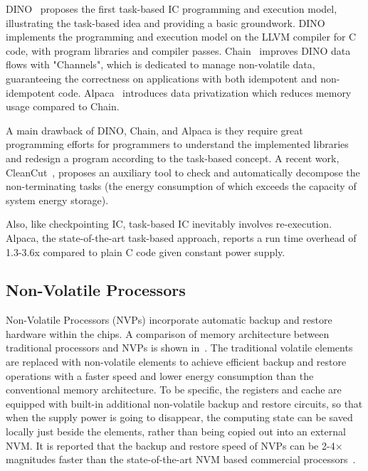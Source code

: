 DINO~\cite{lucia2015simpler} proposes the first task-based IC programming and execution model, illustrating the task-based idea and providing a basic groundwork. DINO implements the programming and execution model on the LLVM compiler for C code, with program libraries and compiler passes. Chain~\cite{colin2016chain} improves DINO data flows with "Channels", which is dedicated to manage non-volatile data, guaranteeing the correctness on applications with both idempotent and non-idempotent code. Alpaca~\cite{maeng2017alpaca} introduces data privatization which reduces memory usage compared to Chain.

A main drawback of DINO, Chain, and Alpaca is they require great programming efforts for programmers to understand the implemented libraries and redesign a program according to the task-based concept. A recent work, CleanCut~\cite{colin2018termination}, proposes an auxiliary tool to check and automatically decompose the non-terminating tasks (the energy consumption of which exceeds the capacity of system energy storage). 

Also, like checkpointing IC, task-based IC inevitably involves re-execution. Alpaca, the state-of-the-art task-based approach, reports a run time overhead of 1.3-3.6x compared to plain C code given constant power supply. 

\subsection{Non-Volatile Processors}

Non-Volatile Processors (NVPs) incorporate automatic backup and restore hardware within the chips. A comparison of memory architecture between traditional processors and NVPs is shown in~. The traditional volatile elements are replaced with non-volatile elements to achieve efficient backup and restore operations with a faster speed and lower energy consumption than the conventional memory architecture. To be specific, the registers and cache are equipped with built-in additional non-volatile backup and restore circuits, so that when the supply power is going to disappear, the computing state can be saved locally just beside the elements, rather than being copied out into an external NVM. It is reported that the backup and restore speed of NVPs can be 2-4$\times$ magnitudes faster than the state-of-the-art NVM based commercial processors~\cite{liu2015ambient}. 


